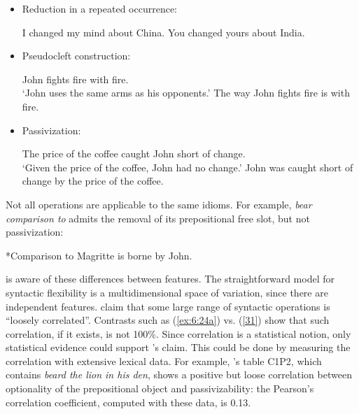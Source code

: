 \documentclass[output=paper]{langsci/langscibook}
\begin{document}
\begin{itemize}
\item Reduction in a repeated occurrence: 

\begin{exe}
\ex \label{ex:6:28}
\begin{xlist}
\ex \label{ex:6:28a}
I changed my mind about China.
\ex \label{ex:6:28b}
You changed yours about India.
\end{xlist}
\end{exe}

\item Pseudocleft construction:

\begin{exe}
\ex \label{ex:6:29}
\begin{xlist}
\ex \label{ex:6:29a}
John fights fire with fire.\\
 ‘John uses the same arms as his opponents.’
\ex \label{ex:6:29b}
The way John fights fire is with fire.
\end{xlist}
\end{exe}

\item Passivization:

\begin{exe}
\ex \label{ex:6:30} 
\begin{xlist}
\ex \label{ex:6:30a}
The price of the coffee caught John short of change.\\
 ‘Given the price of the coffee, John had no change.’
\ex \label{ex:6:30b}
John was caught short of change by the price of the coffee.
\end{xlist}
\end{exe}

\end{itemize}

Not all operations are applicable to the same idioms. For example, \textit{bear comparison to} admits the removal of its prepositional free slot, but not passivization:


\begin{exe}
\ex \label{31}
*Comparison to Magritte is borne by John.
\end{exe}

\noindent \citet[34]{Fraser1970} is aware of these differences between features. The straightforward model for syntactic flexibility is a multidimensional space of variation, since there are independent features. \cite[509]{Nunberg1994} claim that some large range of syntactic operations is “loosely correlated”. Contrasts such as (\ref{ex:6:24a}) vs. (\ref{31}) show that such correlation, if it exists, is not 100\%. Since correlation is a statistical notion, only statistical evidence could support \cite{Nunberg1994}'s claim. This could be done by measuring the correlation with extensive lexical data. For example, \citet{Freckleton1985}'s table C1P2, which contains \textit{beard the lion in his den}, shows a positive but loose correlation between optionality of the prepositional object and passivizability: the Pearson’s correlation coefficient, computed with these data, is 0.13.
\end{document}
